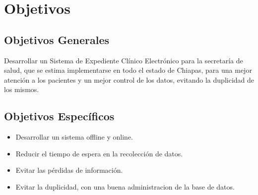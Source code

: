 \section{Objetivos}

    \subsection{Objetivos Generales}
    \label{subsec:objGrales}
  Desarrollar un Sistema de Expediente Clínico Electrónico para la secretaría de salud, que se estima implementarse en todo el estado de Chiapas, para una mejor atención a los pacientes y un mejor control de los datos, evitando la duplicidad de los mismos.

    \subsection{Objetivos Específicos}
    \label{subsec:objetivos especificos}
\begin{itemize}
  \item Desarrollar un sistema offline y online.
  \item Reducir el tiempo de espera en la recolección de datos.
  \item Evitar las pérdidas de información.
  \item Evitar la duplicidad, con una buena administracion de la base de datos.

\end{itemize}
